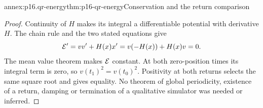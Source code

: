 \begin{annexitem}{annex:p16.qr-energy}{thm:p16-qr-energy}{Conservation and the return comparison}
\begin{proof}
Continuity of \(H\) makes its integral a differentiable potential with
derivative \(H\). The chain rule and the two stated equations give
\[
 {\cal E}'=vv'+H(x)x'=v(-H(x))+H(x)v=0.
\]
The mean value theorem makes \({\cal E}\) constant. At both zero-position
times its integral term is zero, so \(v(t_1)^2=v(t_0)^2\).
Positivity at both returns selects the same square root and gives equality.
No theorem of global periodicity, existence of a return, damping or
termination of a qualitative simulator was needed or inferred.
\end{proof}
\end{annexitem}
